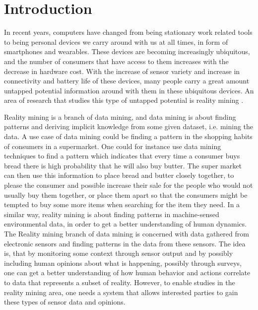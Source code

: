 \chapter{Introduction}
\label{cha:introduction}

In recent years, computers have changed from being stationary work related tools to being personal devices we carry around with us at all times, in form of smartphones and wearables. These devices are becoming increasingly ubiquitous, and the number of consumers that have access to them increases with the decrease in hardware cost. With the increase of sensor variety and increase in connectivity and battery life of these devices, many people carry a great amount untapped potential information around with them in these ubiquitous devices.  An area of research that studies this type of untapped potential is reality mining \parencite{eagle2006_reality_mining_definition}.

\vspace{1em}

\noindent
Reality mining is a branch of data mining, and data mining is about finding patterns and deriving implicit knowledge from some given dataset, i.e. mining the data. A use case of data mining could be finding a pattern in the shopping habits of consumers in a supermarket. One could for instance use data mining techniques to find a pattern which indicates that every time a consumer buys bread there is high probability that he will also buy butter.
The super market can then use this information to place bread and butter closely together, to please the consumer and possible increase their sale for the people who would not usually buy them together, or place them apart so that the consumers might be tempted to buy some more items when searching for the item they need. In a similar way, reality mining is about finding patterns in machine-sensed environmental data, in order to get a better understanding of human dynamics. The Reality mining branch of data mining is concerned with data gathered from electronic sensors and finding patterns in the data from these sensors. The idea is, that by monitoring some context through sensor output and by possibly including human opinions about what is happening, possibly through surveys, one can get a better understanding of how human behavior and actions correlate to data that represents a subset of reality. However, to enable studies in the reality mining area, one needs a system that allows interested parties to gain these types of sensor data and opinions. 

